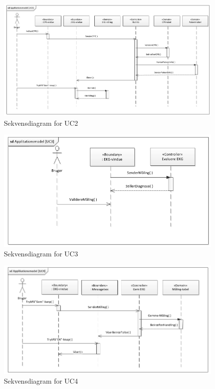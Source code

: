 \begin{figure}[H]
	\centering
	\includegraphics[width=1\textwidth]{Figurer/Snip20150429_33}
	\caption{Sekvensdiagram for UC2}
\end{figure}

\begin{figure}[H]
	\centering
	\includegraphics[width=1\textwidth]{Figurer/Snip20150429_31}
	\caption{Sekvensdiagram for UC3}
\end{figure}

\begin{figure}[H]
	\centering
	\includegraphics[width=1\textwidth]{Figurer/Snip20150429_28}
	\caption{Sekvensdiagram for UC4}
\end{figure}

